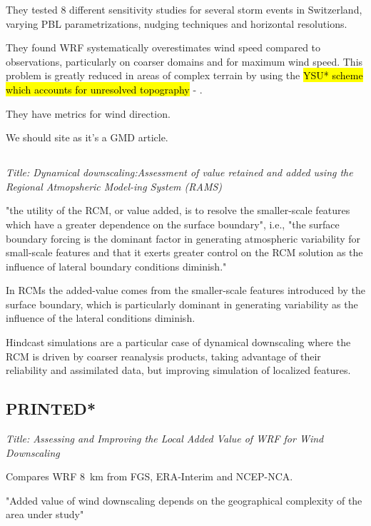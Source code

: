 \documentclass[12pt,a4paper]{article}
\begin{document}
They tested 8 different sensitivity studies for several storm events in Switzerland, varying  \gls{PBL} parametrizations, nudging techniques and horizontal resolutions.

They found WRF systematically overestimates wind speed compared to observations, particularly on coarser domains and for maximum wind speed. This problem is greatly reduced in areas of complex terrain by using the \hl{YSU* scheme which accounts for unresolved topography} - \cite{Jimenez2013}. 

They have metrics for wind direction.

We should site as it's a GMD article.

\subsection{\cite{Castro2005}}

\textit{Title: Dynamical downscaling:Assessment of value retained and added using the Regional Atmopsheric Model-ing System (RAMS)}

"the utility of the RCM, or value added, is to resolve the smaller-scale features which have a greater dependence on the surface boundary", i.e., "the surface boundary forcing is the dominant factor in generating atmospheric variability for small-scale features and that it exerts greater control on the RCM solution as the influence of lateral boundary conditions diminish."

In RCMs the added-value comes from the smaller-scale features introduced by the surface boundary, which is particularly dominant in generating variability as the influence of the lateral conditions diminish. 

Hindcast simulations are a particular case of dynamical downscaling where the RCM is driven by coarser reanalysis products, taking advantage of their reliability and assimilated data, but improving simulation of localized features.

\subsection{\cite{Garcia-Diez2015} PRINTED*}

\textit{Title: Assessing and Improving the Local Added Value of WRF for Wind Downscaling}

Compares WRF 8~km from FGS, ERA-Interim and NCEP-NCA. 

"Added value of wind downscaling depends on the geographical complexity of the area under study" 
\end{document}
